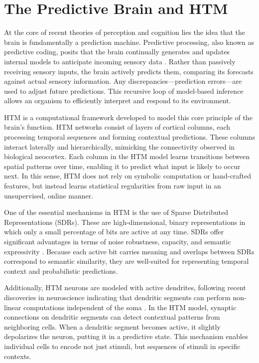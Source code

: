 \documentclass{article}
\begin{document}
\section{The Predictive Brain and HTM}

At the core of recent theories of perception and cognition lies the idea that the brain is fundamentally a prediction machine. Predictive processing, also known as predictive coding, posits that the brain continually generates and updates internal models to anticipate incoming sensory data \parencite{clark2016surfing, friston2010free}. Rather than passively receiving sensory inputs, the brain actively predicts them, comparing its forecasts against actual sensory information. Any discrepancies---prediction errors---are used to adjust future predictions. This recursive loop of model-based inference allows an organism to efficiently interpret and respond to its environment.

HTM is a computational framework developed to model this core principle of the brain's function. HTM networks consist of layers of cortical columns, each processing temporal sequences and forming contextual predictions. These columns interact laterally and hierarchically, mimicking the connectivity observed in biological neocortex. Each column in the HTM model learns transitions between spatial patterns over time, enabling it to predict what input is likely to occur next. In this sense, HTM does not rely on symbolic computation or hand-crafted features, but instead learns statistical regularities from raw input in an unsupervised, online manner.

One of the essential mechanisms in HTM is the use of Sparse Distributed Representations (SDRs). These are high-dimensional, binary representations in which only a small percentage of bits are active at any time. SDRs offer significant advantages in terms of noise robustness, capacity, and semantic expressivity \parencite{ahmad2015properties}. Because each active bit carries meaning and overlaps between SDRs correspond to semantic similarity, they are well-suited for representing temporal context and probabilistic predictions.

Additionally, HTM neurons are modeled with active dendrites, following recent discoveries in neuroscience indicating that dendritic segments can perform non-linear computations independent of the soma \parencite{mountcastle1998perceptual,hawkins2016why,hawkins2004intelligence}. In the HTM model, synaptic connections on dendritic segments can detect contextual patterns from neighboring cells. When a dendritic segment becomes active, it slightly depolarizes the neuron, putting it in a predictive state. This mechanism enables individual cells to encode not just stimuli, but sequences of stimuli in specific contexts.
\end{document}
